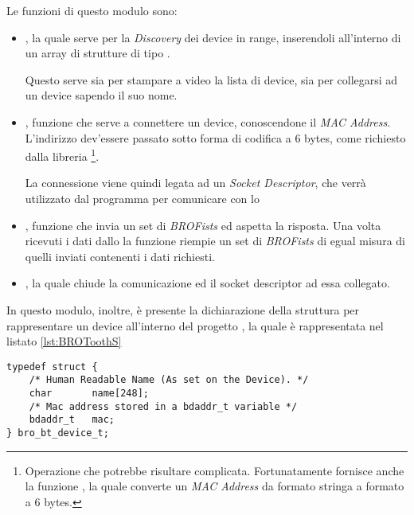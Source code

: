 Le funzioni di questo modulo sono:
\begin{itemize}
    \item {}, la
        quale serve per la \emph{Discovery} dei device 
        in range, inserendoli all'interno di un array di strutture di tipo
        .

        Questo serve sia per stampare a video la lista di device, sia per
        collegarsi ad un device sapendo il suo nome.
    \item {}, funzione
        che serve a connettere un device, conoscendone il \emph{MAC
        Address}. L'indirizzo dev'essere passato sotto forma di codifica a
        $6$ bytes, come richiesto dalla libreria
        \footnote{Operazione che potrebbe risultare
        complicata. Fortunatamente  fornisce anche la
        funzione , la
        quale converte un \emph{MAC Address} da formato stringa a formato a
        $6$ bytes.}.
        
        La connessione viene quindi legata ad un \emph{Socket
        Descriptor}, che verrà utilizzato dal programma per comunicare con
        lo \SPAM{}
    \item {}, funzione che invia un set di \emph{BROFists} ed aspetta la
        risposta. Una volta ricevuti i dati dallo \SPAM{} la funzione
        riempie un set di \emph{BROFists} di egual misura di quelli
        inviati contenenti i dati richiesti.
    \item {}, la quale chiude la
        comunicazione ed il socket descriptor ad essa collegato.
\end{itemize}

In questo modulo, inoltre, è presente la dichiarazione della struttura per
rappresentare un device  all'interno del progetto
\BROFist{}, la quale è rappresentata nel listato \ref{lst:BROToothS}

\begin{figure*}[htbp]
    \begin{lstlisting}[caption=BlueTooth Device Identification Structure,
                       label=lst:BROToothS]
typedef struct {
    /* Human Readable Name (As set on the Device). */
    char       name[248];      
    /* Mac address stored in a bdaddr_t variable */
    bdaddr_t   mac;             
} bro_bt_device_t;

    \end{lstlisting}
\end{figure*}

